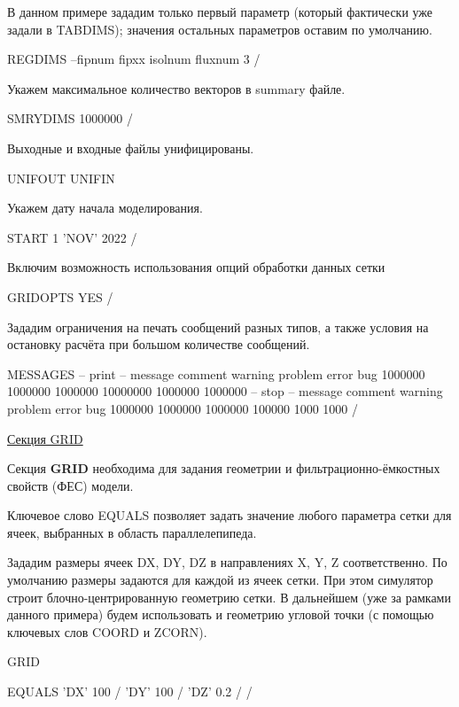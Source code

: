 В данном примере зададим только первый параметр (который фактически уже задали в TABDIMS); значения остальных параметров оставим по умолчанию.
\begin{eclrun}
REGDIMS
--fipnum fipxx isolnum fluxnum 
 3  /
\end{eclrun}

Укажем максимальное количество векторов в summary файле.
\begin{eclrun}
SMRYDIMS
1000000  /
\end{eclrun}

Выходные и входные файлы унифицированы.
\begin{eclrun}
UNIFOUT
UNIFIN
\end{eclrun}

Укажем дату начала моделирования.
\begin{eclrun}
START
1 'NOV' 2022 /
\end{eclrun}

Включим возможность использования опций обработки данных сетки
\begin{eclrun}
GRIDOPTS
YES /
\end{eclrun}

Зададим ограничения на печать сообщений разных типов, а также условия на остановку расчёта при большом количестве сообщений.
\begin{eclrun}
MESSAGES
-- print                                            
-- message comment warning problem  error   bug     
   1000000 1000000 1000000 10000000 1000000 1000000
-- stop
-- message comment warning problem error bug
   1000000 1000000 1000000 100000  1000  1000  /
\end{eclrun}

\underline{Секция GRID}

Секция \textbf{GRID} необходима для задания геометрии и фильтрационно-ёмкостных свойств (ФЕС) модели.

Ключевое слово EQUALS позволяет задать значение любого параметра сетки для ячеек, выбранных в область параллелепипеда.

Зададим размеры ячеек DX, DY, DZ в направлениях X, Y, Z соответственно. По умолчанию размеры задаются для каждой из ячеек сетки. 
При этом симулятор строит блочно-центрированную геометрию сетки.
В дальнейшем (уже за рамками данного примера) будем использовать и геометрию угловой точки (с помощью ключевых слов COORD и ZCORN).
\begin{eclrun}
GRID

EQUALS
'DX'    100  /
'DY'    100  /
'DZ'    0.2  /
/
\end{eclrun}


